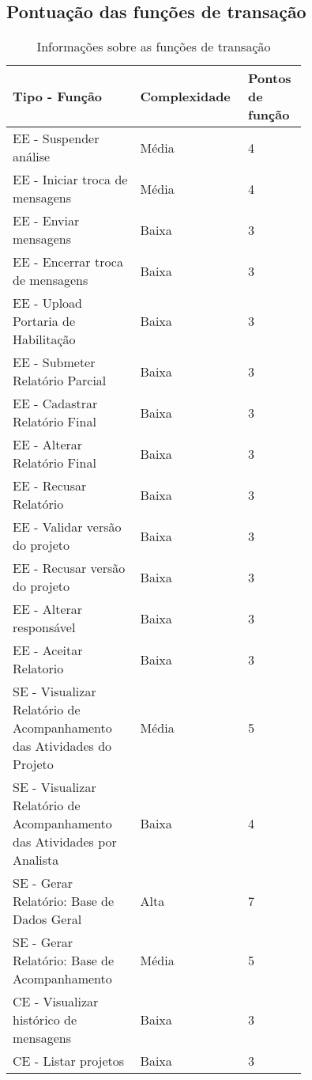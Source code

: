     
    
    
\vfill
\pagebreak
  \subsection{Pontuação das funções de transação}
    
	\begin{table*}[!h]
	\centering
	\caption{Informações sobre as funções de transação}
	\label{funcoes_transacao}
	  \begin{tabular}{|p{0.40\linewidth}|p{0.20\linewidth}|p{0.14\linewidth}|}
	\hline
	\textbf{Tipo - Função} & \textbf{Complexidade} & \textbf{Pontos de função} \\
	\hline
	  EE - Suspender análise & Média & 4 \\ \hline
	  EE - Iniciar troca de mensagens & Média & 4 \\ \hline
	  EE - Enviar mensagens & Baixa & 3\\ \hline
	  EE - Encerrar troca de mensagens & Baixa & 3 \\ \hline
	  EE - Upload Portaria de Habilitação &Baixa & 3\\ \hline
	  EE - Submeter Relatório Parcial & Baixa & 3 \\ \hline
	  EE - Cadastrar Relatório Final & Baixa & 3  \\ \hline
	  EE - Alterar Relatório Final & Baixa & 3  \\ \hline
	  EE - Recusar Relatório & Baixa & 3\\ \hline
	  EE - Validar versão do projeto & Baixa &3 \\ \hline
	  EE - Recusar versão do projeto & Baixa & 3\\ \hline
	  EE - Alterar responsável & Baixa & 3\\ \hline
	  EE - Aceitar Relatorio & Baixa&3 \\ \hline
	  SE - Visualizar Relatório de Acompanhamento das Atividades do Projeto & Média & 5 \\ \hline
	  SE - Visualizar Relatório de Acompanhamento das Atividades por Analista & Baixa & 4\\ \hline
	  SE - Gerar Relatório: Base de Dados Geral & Alta& 7\\ \hline
	  SE - Gerar Relatório: Base de Acompanhamento & Média & 5\\ \hline
	  CE - Visualizar histórico de mensagens & Baixa& 3\\ \hline
	  CE - Listar projetos & Baixa& 3\\ \hline

\end{tabular}
\end{table*}
